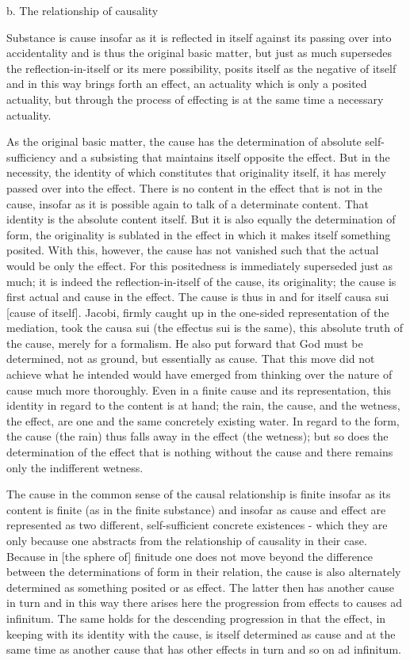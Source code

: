 b. The relationship of causality

Substance is cause insofar as it is reflected in itself
against its passing over into accidentality and
is thus the original basic matter,
but just as much supersedes the reflection-in-itself
or its mere possibility,
posits itself as the negative of itself and
in this way brings forth an effect,
an actuality which is only a posited actuality,
but through the process of effecting is
at the same time a necessary actuality.

As the original basic matter, the cause has
the determination of absolute self-sufficiency and
a subsisting that maintains itself opposite the effect.
But in the necessity, the identity of which
constitutes that originality itself,
it has merely passed over into the effect.
There is no content in the effect that is not in the cause,
insofar as it is possible again to talk of a determinate content.
That identity is the absolute content itself.
But it is also equally the determination of form,
the originality is sublated in the effect in which
it makes itself something posited.
With this, however, the cause has not vanished such that
the actual would be only the effect.
For this positedness is immediately superseded just as much;
it is indeed the reflection-in-itself of the cause, its originality;
the cause is first actual and cause in the effect.
The cause is thus in and for itself causa sui [cause of itself].
Jacobi, firmly caught up in the one-sided
representation of the mediation, took the causa sui (the effectus sui is
the same), this absolute truth of the cause, merely for a formalism.
He also put forward that God must be determined, not as ground,
but essentially as cause.
That this move did not achieve what he
intended would have emerged from thinking over the nature of
cause much more thoroughly.
Even in a finite cause and its representation,
this identity in regard to the content is at hand;
the rain, the cause, and the wetness, the effect, are one and the same
concretely existing water.
In regard to the form, the cause (the rain) thus
falls away in the effect (the wetness);
but so does the determination of the effect
that is nothing without the cause and
there remains only the indifferent wetness.

The cause in the common sense of the causal relationship is finite
insofar as its content is finite (as in the finite substance) and insofar
as cause and effect are represented as two different, self-sufficient
concrete existences - which they are only because one abstracts from
the relationship of causality in their case. Because in [the sphere
of] finitude one does not move beyond the difference between the
determinations of form in their relation, the cause is also alternately
determined as something posited or as effect. The latter then has
another cause in turn and in this way there arises here the
progression from effects to causes ad infinitum. The same holds for
the descending progression in that the effect, in keeping with its
identity with the cause, is itself determined as cause and at the same
time as another cause that has other effects in turn and so on ad
infinitum.


